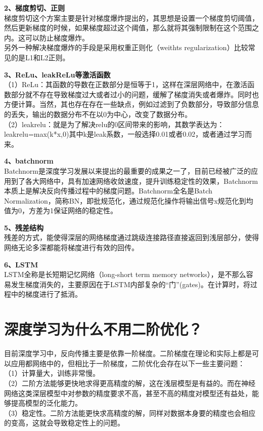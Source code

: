 \textbf{2、梯度剪切、正则}\\
梯度剪切这个方案主要是针对梯度爆炸提出的，其思想是设置一个梯度剪切阈值，然后更新梯度的时候，如果梯度超过这个阈值，那么就将其强制限制在这个范围之内。这可以防止梯度爆炸。\\
另外一种解决梯度爆炸的手段是采用权重正则化（weithts
regularization）比较常见的是L1和L2正则。

\textbf{3、ReLu、leakReLu等激活函数}\\
（1）ReLu：其函数的导数在正数部分是恒等于1，这样在深层网络中，在激活函数部分就不存在导致梯度过大或者过小的问题，缓解了梯度消失或者爆炸。同时也方便计算。当然，其也存在存在一些缺点，例如过滤到了负数部分，导致部分信息的丢失，输出的数据分布不在以0为中心，改变了数据分布。\\
（2）leakrelu：就是为了解决relu的0区间带来的影响，其数学表达为：leakrelu=max(k*x,0)其中k是leak系数，一般选择0.01或者0.02，或者通过学习而来。

\textbf{4、batchnorm}\\
Batchnorm是深度学习发展以来提出的最重要的成果之一了，目前已经被广泛的应用到了各大网络中，具有加速网络收敛速度，提升训练稳定性的效果，Batchnorm本质上是解决反向传播过程中的梯度问题。Batchnorm全名是Batch
Normalization，简称BN，即批规范化，通过规范化操作将输出信号x规范化到均值为0，方差为1保证网络的稳定性。

\textbf{5、残差结构}\\
残差的方式，能使得深层的网络梯度通过跳级连接路径直接返回到浅层部分，使得网络无论多深都能将梯度进行有效的回传。

\textbf{6、LSTM}\\
LSTM全称是长短期记忆网络（long-short term memory
networks），是不那么容易发生梯度消失的，主要原因在于LSTM内部复杂的``门''(gates)。在计算时，将过程中的梯度进行了抵消。

\section{深度学习为什么不用二阶优化？}\label{ux6df1ux5ea6ux5b66ux4e60ux4e3aux4ec0ux4e48ux4e0dux7528ux4e8cux9636ux4f18ux5316}

目前深度学习中，反向传播主要是依靠一阶梯度。二阶梯度在理论和实际上都是可以应用都网络中的，但相比于一阶梯度，二阶优化会存在以下一些主要问题：\\
（1）计算量大，训练非常慢。\\
（2）二阶方法能够更快地求得更高精度的解，这在浅层模型是有益的。而在神经网络这类深层模型中对参数的精度要求不高，甚至不高的精度对模型还有益处，能够提高模型的泛化能力。\\
（3）稳定性。二阶方法能更快求高精度的解，同样对数据本身要的精度也会相应的变高，这就会导致稳定性上的问题。

